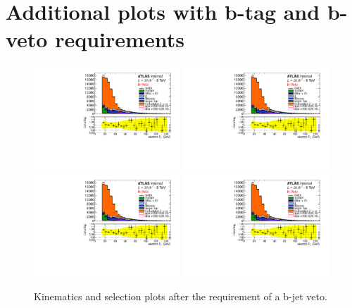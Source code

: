 \clearpage
\chapter{Additional plots with b-tag and b-veto requirements}
\label{appendix:add_btag_bveto}

\begin{figure}[htp]
     \begin{center}

           \includegraphics[page=1, width=0.49\textwidth]{figure/appendix/std_plots_Bveto.pdf}
            \includegraphics[page=2, width=0.49\textwidth]{figure/appendix/std_plots_Bveto.pdf}
            \includegraphics[page=3, width=0.49\textwidth]{figure/appendix/std_plots_Bveto.pdf}
            \includegraphics[page=4, width=0.49\textwidth]{figure/appendix/std_plots_Bveto.pdf}

    \end{center}
    \caption{Kinematics and selection plots after the requirement of a b-jet veto.}
\end{figure}

